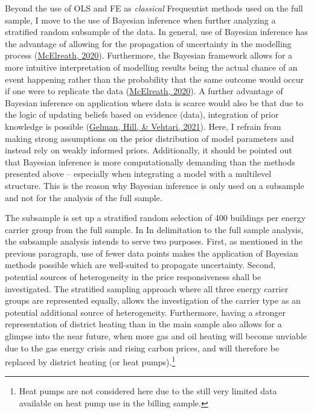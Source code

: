 \documentclass[12pt,twoside]{reedthesis}
\begin{document}
Beyond the use of OLS and FE as \emph{classical} Frequentist methods used on the full sample, I move to the use of Bayesian inference when further analyzing a stratified random subsample of the data. In general, use of Bayesian inference has the advantage of allowing for the propagation of uncertainty in the modelling process (\protect\hyperlink{ref-mcelreath20}{McElreath, 2020}). Furthermore, the Bayesian framework allows for a more intuitive interpretation of modelling results being the actual chance of an event happening rather than the probability that the same outcome would occur if one were to replicate the data (\protect\hyperlink{ref-mcelreath20}{McElreath, 2020}). A further advantage of Bayesian inference on application where data is scarce would also be that due to the logic of updating beliefs based on evidence (data), integration of prior knowledge is possible (\protect\hyperlink{ref-gelman_etal21}{Gelman, Hill, \& Vehtari, 2021}). Here, I refrain from making strong assumptions on the prior distribution of model parameters and instead rely on weakly informed priors. Additionally, it should be pointed out that Bayesian inference is more computationally demanding than the methods presented above -- especially when integrating a model with a multilevel structure. This is the reason why Bayesian inference is only used on a subsample and not for the analysis of the full sample.

The subsample is set up a stratified random selection of 400 buildings per energy carrier group from the full sample. In In delimitation to the full sample analysis, the subsample analysis intends to serve two purposes. First, as mentioned in the previous paragraph, use of fewer data points makes the application of Bayesian methods possible which are well-suited to propagate uncertainty. Second, potential sources of heterogeneity in the price responsiveness shall be investigated. The stratified sampling approach where all three energy carrier groups are represented equally, allows the investigation of the carrier type as an potential additional source of heterogeneity. Furthermore, having a stronger representation of district heating than in the main sample also allows for a glimpse into the near future, when more gas and oil heating will become unviable due to the gas energy crisis and rising carbon prices, and will therefore be replaced by district heating (or heat pumps).\footnote{Heat pumps are not considered here due to the still very limited data available on heat pump use in the billing sample.}
\end{document}
